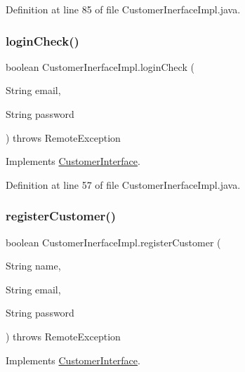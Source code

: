 Definition at line 85 of file Customer\+Inerface\+Impl.\+java.

\mbox{\label{class_customer_inerface_impl_a508e5e0b67fd7dc5b0852af19d20bc31}} 
\subsubsection{\texorpdfstring{loginCheck()}{loginCheck()}}
{\footnotesize\ttfamily boolean Customer\+Inerface\+Impl.\+login\+Check (\begin{DoxyParamCaption}\item[{String}]{email,  }\item[{String}]{password }\end{DoxyParamCaption}) throws Remote\+Exception}



Implements \mbox{\hyperlink{interface_customer_interface_aded022cc5a8b728bc07ded2267fd4f07}{Customer\+Interface}}.



Definition at line 57 of file Customer\+Inerface\+Impl.\+java.

\mbox{\label{class_customer_inerface_impl_aa5029a5038b56d80f3858d8e259f2f20}} 
\subsubsection{\texorpdfstring{registerCustomer()}{registerCustomer()}}
{\footnotesize\ttfamily boolean Customer\+Inerface\+Impl.\+register\+Customer (\begin{DoxyParamCaption}\item[{String}]{name,  }\item[{String}]{email,  }\item[{String}]{password }\end{DoxyParamCaption}) throws Remote\+Exception}



Implements \mbox{\hyperlink{interface_customer_interface_ad0130eaa14a8f40060a9328aeedab244}{Customer\+Interface}}.



